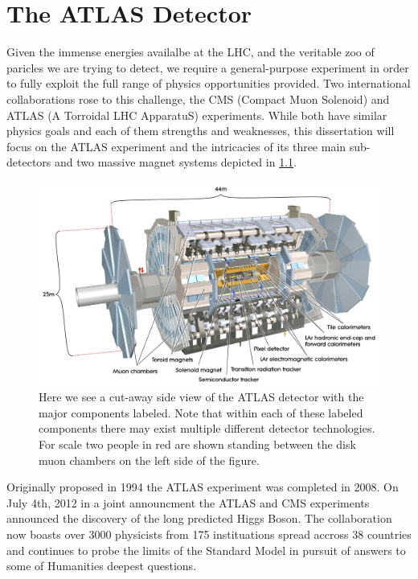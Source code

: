 \chapter{The ATLAS Detector} \label{chap:atlas}

Given the immense energies availalbe at the LHC, and the veritable zoo of
paricles we are trying to detect, we require a general-purpose experiment in
order to fully exploit the full range of physics opportunities provided.  Two
international collaborations rose to this challenge, the CMS (Compact Muon
Solenoid) and ATLAS (A Torroidal LHC ApparatuS) experiments.  While both have
similar physics goals and each of them strengths and weaknesses, this
dissertation will focus on the ATLAS experiment and the intricacies of its three
main sub-detectors and two massive magnet systems depicted in
\cref{fig:atlas_cutaway}.

\begin{figure}[!htbp]
  \begin{center}
    \includegraphics[width=0.9\linewidth]{figures/atlas/atlas_cutaway.pdf}
    \caption{ \cite{PERF-2007-01} Here we see a cut-away side view of the ATLAS
detector with the major components labeled.  Note that within each of these
labeled components there may exist multiple different detector technologies.
For scale two people in red are shown standing between the disk muon chambers on the
left side of the figure. }
    \label{fig:atlas_cutaway}
  \end{center}
\end{figure}

Originally proposed in 1994 the ATLAS experiment was completed in 2008. On
July 4th, 2012 in a joint announcment the ATLAS and CMS experiments announced
the discovery of the long predicted Higgs Boson.  The collaboration now boasts
over 3000 physicists from 175 instituations spread accross 38 countries and
continues to probe the limits of the Standard Model in pursuit of answers to
some of Humanities deepest questions.

